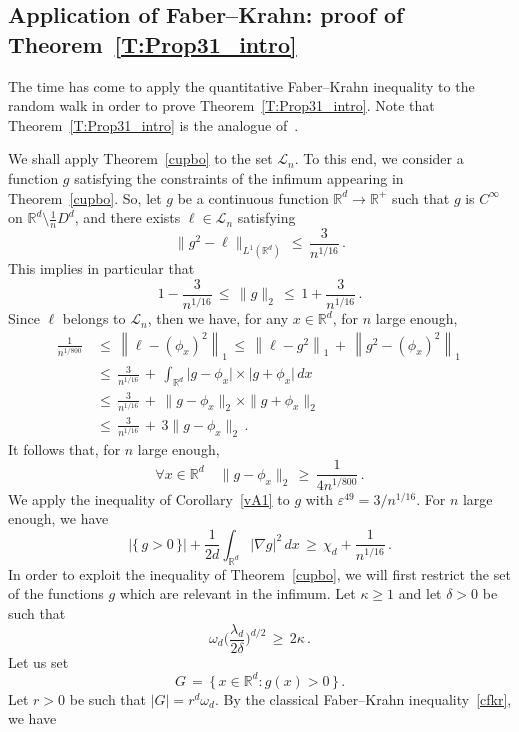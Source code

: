\documentclass[AHL, Unicode, longabstracts, published]{cedram}
\newcommand*\Rd {{\mathbb R^d}}
\newcommand*\R{\mathbb{R}}
\newcommand{\cL}{\mathcal{L}}
\let\oldforall\forall
\renewcommand*{\forall}{\mathrel{\oldforall}}
\begin{document}
\subsection{Application of Faber--Krahn: proof of Theorem~\ref{T:Prop31_intro}}

The time has come to apply the quantitative Faber--Krahn inequality to the random walk in order to prove Theorem~\ref{T:Prop31_intro}. Note that Theorem~\ref{T:Prop31_intro} is the analogue of~\cite[Proposition~3.1]{BO}.


We shall apply Theorem~\ref{cupbo} to the set $\cL_n$. To this end, we consider a function $g$ satisfying the constraints of the infimum appearing in Theorem~\ref{cupbo}. So, let $g$ be a continuous function $\Rd\to\R^+$ such that $g$ is $C^\infty$ on $\Rd\setminus \frac{1}{n}D^d$, and there exists $\ell\in\cL_n$ satisfying
\[
\big\|g^2- \ell\big\|_{L^1(\Rd)}
\,\leq\,
\frac{3}{n^{1/16}}\,.
\]
This implies in particular that
\[
1-\frac{3}{n^{1/16}}\,\leq\,
\big\| g\big\|_2\,\leq\, 1+\frac{3}{n^{1/16}}
\,.
\]
Since $\ell$ belongs to $\cL_n$, then we have, for any $x\in\Rd$, for $n$ large enough,
\begin{align*}
\frac{1}{n^{1/800}} &\,\leq\, \left\|\ell-(\phi_x)^2\right\|_1\,\leq\, \left\|\ell-g^2\right\|_1\,+\, \left\|g^2-(\phi_x)^2\right\|_1\,\\ &\,\leq\,
\frac{3}{n^{1/16}}\,+\,
\int_{\Rd}
\big|g -\phi_x\big|\times
\big|g +\phi_x\big|
\,dx\\ &\,\leq\, \frac{3}{n^{1/16}}\,+\, \|g-\phi_x\|_2\times \|g+\phi_x\|_2\\ &\,\leq\, \frac{3}{n^{1/16}}\,+\, 3\|g-\phi_x\|_2
\,.
\end{align*}
It follows that, for $n$ large enough,
\[
\forall x\in\Rd\quad \|g-\phi_x\|_2\,\geq\,
\frac{1}{4n^{1/800}}\,.
\]
We apply the inequality of Corollary~\ref{vA1} to $g$ with $\varepsilon^{49}=3/{n^{1/16}}$. For $n$ large enough, we have
\begin{equation}\label{zntert}
\big|\{\,g>0\,\}\big|+\frac{1}{2d}
\int_{\Rd}\big|\nabla g\big|^2\,dx\,\geq\,\chi_d+
\frac{1}{n^{1/16}}\,.
\end{equation}
In order to exploit the inequality of Theorem~\ref{cupbo}, we will first restrict the set of the functions $g$ which are relevant in the infimum. Let $\kappa\geq 1$ and let $\delta>0$ be such that
\[
\omega_d
\Big(\frac{\lambda_d}{{2}\delta}\Big)^{d/2}\,\geq\,2\kappa\,.
\]
Let us set
\[
G\,=\,\big\{\,x\in \Rd:g(x)>0\,\big\}\,.
\]
Let $r>0$ be such that $|G|=r^d\omega_d$. By the classical Faber--Krahn inequality~\eqref{cfkr}, we have
\end{document}
